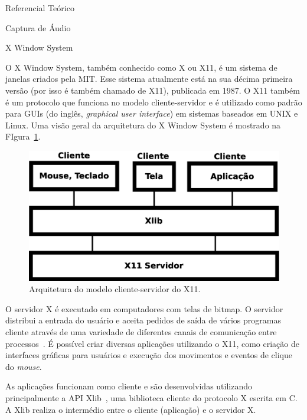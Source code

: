 \begin{chapter}{Referencial Teórico}
\begin{section}{Captura de Áudio}
\end{section}

\begin{section}{X Window System}

O X Window System, também conhecido como X ou X11, é um sistema de janelas
criados pela MIT. Esse sistema atualmente está na sua décima primeira versão
(por isso é também chamado de X11), publicada em 1987. O X11 também é um
protocolo que funciona no modelo cliente-servidor e é utilizado como padrão para
GUIs (do inglês, \textit{graphical user interface}) em sistemas baseados em UNIX
e Linux. Uma visão geral da arquitetura do X Window System é mostrado na
FIgura~\ref{fig:x11}.

\begin{figure}[!h]
	\centering
	\begin{minipage}[c]{\textwidth}
	\centering
	\includegraphics[width=0.7\linewidth]{fig/X11}
	\caption{Arquitetura do modelo cliente-servidor do X11.}
	\label{fig:x11}
	\end{minipage}
\end{figure} 

O servidor X é executado em computadores com telas de bitmap. O servidor
distribui a entrada do usuário e aceita pedidos de saída de vários programas
cliente através de uma variedade de diferentes canais de comunicação entre
processos~\cite{suse}. É possível criar diversas aplicações utilizando o X11,
como criação de interfaces gráficas para usuários e execução dos movimentos e
eventos de clique do \textit{mouse}. 

As aplicações funcionam como cliente e são desenvolvidas utilizando 
principalmente a API Xlib~\cite{xlib}, uma biblioteca cliente do protocolo X escrita
em C. A Xlib realiza o intermédio entre o cliente (aplicação) e o servidor X.  
\end{section}

\end{chapter}
